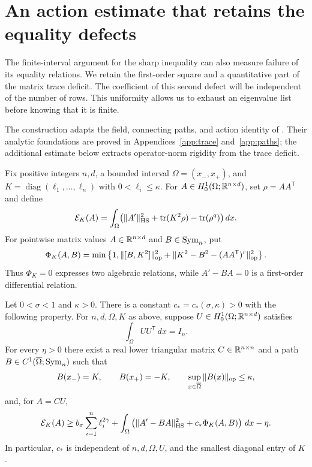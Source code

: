\section{An action estimate that retains the equality defects}
\label{act:section}

The finite-interval argument for the sharp inequality can also measure
failure of its equality relations.  We retain the first-order square
and a quantitative part of the matrix trace deficit.  The coefficient
of this second defect will be independent of the number of rows.  This
uniformity allows us to exhaust an eigenvalue list before knowing that
it is finite.

The construction adapts the field, connecting paths, and action
identity of \cite[Sections~3--6]{MLT}.  Their analytic foundations are
proved in Appendices~\ref{app:trace} and~\ref{app:paths}; the additional
estimate below extracts operator-norm rigidity from the trace deficit.

Fix positive integers $n,d$, a bounded interval
$\Omega=(x_-,x_+)$, and
$K=\operatorname{diag}(\ell_1,\ldots,\ell_n)$ with
$0<\ell_i\leq\kappa$.  For
$A\in H^1_0(\Omega;\mathbb R^{n\times d})$, set $\rho=AA^{\mathsf T}$
and define
\begin{equation}\label{act:energy}
 \mathcal E_K(A)=\int_\Omega
 \bigl(\|A'\|_{\mathrm{HS}}^2+\operatorname{tr}(K^2\rho)-\operatorname{tr}(\rho^q)\bigr)\,dx.
\end{equation}
For pointwise matrix values $A\in\mathbb R^{n\times d}$ and
$B\in\operatorname{Sym}_n$, put
\begin{equation}\label{act:defect}
 \Phi_K(A,B)=\min\left\{1,
       \|[B,K^2]\|_{\operatorname{op}}^2
       +\|K^2-B^2-(AA^{\mathsf T})^r\|_{\operatorname{op}}^2\right\}.
\end{equation}
Thus $\Phi_K=0$ expresses two algebraic relations, while
$A'-BA=0$ is a first-order differential relation.

\begin{theorem}
\label{act:quantitative-action}
Let $0<\sigma<1$ and $\kappa>0$.  There is a constant
$c_*=c_*(\sigma,\kappa)>0$ with the following property.
For $n,d,\Omega,K$ as above, suppose
$U\in H^1_0(\Omega;\mathbb R^{n\times d})$ satisfies
\[
                  \int_\Omega UU^{\mathsf T}\,dx=I_n.
\]
For every $\eta>0$ there exist a real lower triangular matrix
$C\in\mathbb R^{n\times n}$ and a path
$B\in C^1(\overline\Omega;\operatorname{Sym}_n)$ such that
\[
 B(x_-)=K,\qquad B(x_+)=-K,\qquad
 \sup_{x\in\overline\Omega}\|B(x)\|_{\operatorname{op}}\leq\kappa,
\]
and, for $A=CU$,
\begin{equation}\label{act:bound}
 \mathcal E_K(A)\geq b_\sigma\sum_{i=1}^n\ell_i^{2\gamma}
   +\int_\Omega\left(\|A'-BA\|_{\mathrm{HS}}^2
                        +c_*\Phi_K(A,B)\right)\,dx-\eta.
\end{equation}
In particular, $c_*$ is independent of $n,d,\Omega,U$, and the
smallest diagonal entry of $K$.
\end{theorem}

